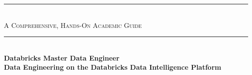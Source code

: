 \begin{titlepage}
\centering

{\color{primary}\rule{\textwidth}{2.5pt}}\\[0.35cm]
{\Large\scshape\color{primarydark} A Comprehensive, Hands-On Academic Guide}\\[0.30cm]
{\color{primary}\rule{\textwidth}{2.5pt}}\\[1.15cm]

{\fontsize{36}{42}\selectfont\bfseries\color{primarydark}%
 Databricks Master Data Engineer}\\[0.55cm]
{\fontsize{20}{25}\selectfont\bfseries\color{accent}%
 Data Engineering on the Databricks Data Intelligence Platform}\\[1.05cm]


\end{titlepage}
